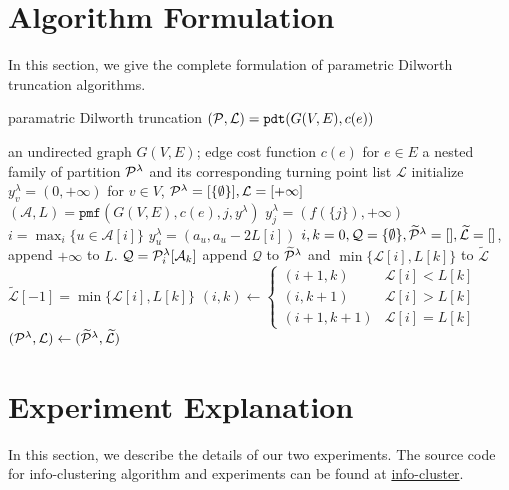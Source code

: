 \documentclass{article}
\begin{document}
\section{Algorithm Formulation}
In this section, we give the complete formulation of parametric Dilworth truncation algorithms.
\begin{algorithm}
	\caption{paramatric Dilworth truncation $(\P, \mathcal{L})=\texttt{pdt}(G(V,E), c(e))$}\label{alg:pdt}
	\begin{algorithmic}[1]
		\REQUIRE an undirected graph $G(V, E)$; edge cost function $c(e)$ for $e\in E$
		\ENSURE a nested family of partition $\P^{\lambda}$ and its corresponding turning point list $\mathcal{L}$
		\STATE initialize $y^{\lambda}_v = (0, +\infty)$ for $ v \in V$, $\P^{\lambda} = [\{\emptyset\}], \mathcal{L} = [+\infty]$
		\STATE  $(\mathcal{A}, L) = \texttt{pmf}(G(V,E), c(e), j, y^{\lambda})$
		\STATE $y^{\lambda}_j = (f(\{j\}), +\infty)$
		\ELSE
		\STATE $ i = \max_i \{ u \in \mathcal{A}[i]\}$
		\STATE $y_u^{\lambda} = (a_u, a_u - 2 L[i])$
		\ENDIF
		\ENDIF
		\ENDFOR
		\STATE $i, k = 0, \mathcal{Q} = \{\emptyset\}, \widetilde{\mathcal{\P}}^{\lambda} = [], \widetilde{\mathcal{L}} = []$, append $+\infty$ to $L$.
		\STATE $\mathcal{Q} = \P^{\lambda}_i[\mathcal{A}_k]$
		\STATE append $\mathcal{Q}$ to $\widetilde{\mathcal{\P}}^{\lambda}$ and $\min\{\mathcal{L}[i], L[k]\}$
		to $\widetilde{\mathcal{L}}$
		\ELSE
		\STATE $\widetilde{\mathcal{L}}[-1] = \min\{\mathcal{L}[i], L[k]\}$
		\ENDIF
		\STATE $(i, k) \leftarrow \begin{cases} (i+1, k) & \mathcal{L}[i] < L[k] \\  (i, k+1) & \mathcal{L}[i] > L[k]\\ (i+1, k+1) & \mathcal{L}[i] = L[k]\end{cases}$
		\ENDWHILE
		\STATE $(\P^{\lambda}, \mathcal{L}) \leftarrow (\widetilde{\mathcal{\P}}^{\lambda},  \widetilde{\mathcal{L}})$
		\ENDFOR
	\end{algorithmic}
\end{algorithm}
\section{Experiment Explanation}
In this section, we describe the details of our two experiments. The source code for info-clustering algorithm and experiments can be found at \href{https://github.com/zhaofeng-shu33/principal\_sequence\_of\_partition}{info-cluster}.
\end{document}
